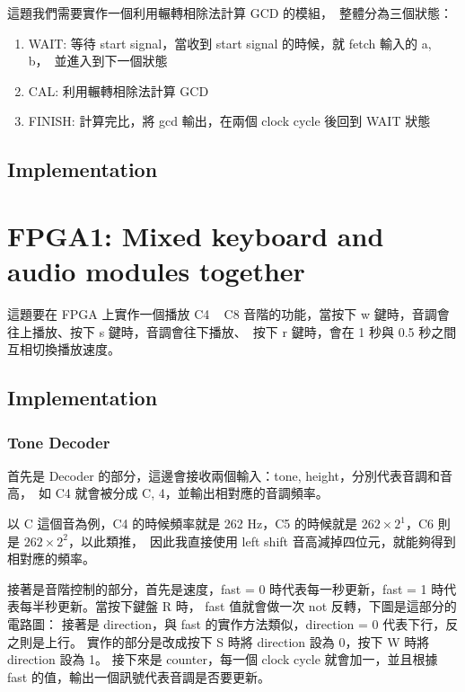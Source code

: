 \documentclass[10.5pt,compsoc,UTF8]{CjC}
\theoremstyle{mystyle}
\begin{document}
這題我們需要實作一個利用輾轉相除法計算 GCD 的模組，\
整體分為三個狀態：
\begin{enumerate}
  \item WAIT: 等待 start signal，當收到 start signal 的時候，就 fetch 輸入的 a, b，\
        並進入到下一個狀態
  \item CAL: 利用輾轉相除法計算 GCD
  \item FINISH: 計算完比，將 gcd 輸出，在兩個 clock cycle 後回到 WAIT 狀態
\end{enumerate}

\subsection{Implementation}

\section{FPGA1: Mixed keyboard and audio modules together}

這題要在 FPGA 上實作一個播放 C4 ~ C8 音階的功能，當按下 w 鍵時，音調會往上播放、按下 s 鍵時，音調會往下播放、\
按下 r 鍵時，會在 1 秒與 0.5 秒之間互相切換播放速度。

\subsection{Implementation}
\subsubsection*{Tone Decoder}
首先是 Decoder 的部分，這邊會接收兩個輸入：tone, height，分別代表音調和音高，\
如 C4 就會被分成 C, 4，並輸出相對應的音調頻率。
\par
以 C 這個音為例，C4 的時候頻率就是 262 Hz，C5 的時候就是 $262 \times 2^1$，C6 則是 $262 \times 2^2$，以此類推，\
因此我直接使用 left shift 音高減掉四位元，就能夠得到相對應的頻率。


接著是音階控制的部分，首先是速度，fast = 0 時代表每一秒更新，fast = 1 時代表每半秒更新。當按下鍵盤 R 時，
fast 值就會做一次 not 反轉，下圖是這部分的電路圖：
接著是 direction，與 fast 的實作方法類似，direction = 0 代表下行，反之則是上行。
實作的部分是改成按下 S 時將 direction 設為 0，按下 W 時將 direction 設為 1。
接下來是 counter，每一個 clock cycle 就會加一，並且根據 fast 的值，輸出一個訊號代表音調是否要更新。
\end{document}
